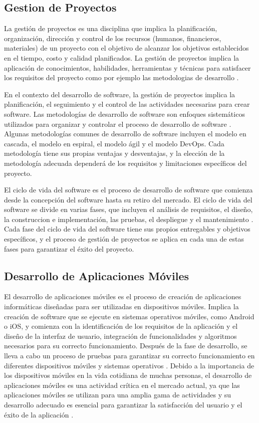 \documentclass[runningheads]{llncs}
\begin{document}
        \subsection{Gestion de Proyectos}
            La gestión de proyectos es una disciplina que implica la planificación, organización, dirección y control de los recursos (humanos, financieros, materiales) de un proyecto con el objetivo de alcanzar los objetivos establecidos en el tiempo, costo y calidad planificados. La gestión de proyectos implica la aplicación de conocimientos, habilidades, herramientas y técnicas para satisfacer los requisitos del proyecto como por ejemplo las metodologias de desarrollo \cite{Cita1}.

            En el contexto del desarrollo de software, la gestión de proyectos implica la planificación, el seguimiento y el control de las actividades necesarias para crear software. Las metodologías de desarrollo de software son enfoques sistemáticos utilizados para organizar y controlar el proceso de desarrollo de software \cite{Cita2}. Algunas metodologías comunes de desarrollo de software incluyen el modelo en cascada, el modelo en espiral, el modelo ágil y el modelo DevOps. Cada metodología tiene sus propias ventajas y desventajas, y la elección de la metodología adecuada dependerá de los requisitos y limitaciones específicos del proyecto.

            El ciclo de vida del software es el proceso de desarrollo de software que comienza desde la concepción del software hasta su retiro del mercado. El ciclo de vida del software se divide en varias fases, que incluyen el análisis de requisitos, el diseño, la construccion e implementación, las pruebas, el despliegue y el mantenimiento \cite{Cita3}. Cada fase del ciclo de vida del software tiene sus propios entregables y objetivos específicos, y el proceso de gestión de proyectos se aplica en cada una de estas fases para garantizar el éxito del proyecto.

        \subsection{Desarrollo de Aplicaciones Móviles}
            El desarrollo de aplicaciones móviles es el proceso de creación de aplicaciones informáticas diseñadas para ser utilizadas en dispositivos móviles. Implica la creación de software que se ejecute en sistemas operativos móviles, como Android o iOS, y comienza con la identificación de los requisitos de la aplicación y el diseño de la interfaz de usuario, integración de funcionalidades y algoritmos necesarios para su correcto funcionamiento. Después de la fase de desarrollo, se lleva a cabo un proceso de pruebas para garantizar su correcto funcionamiento en diferentes dispositivos móviles y sistemas operativos \cite{Cita4}.
            Debido a la importancia de los dispositivos móviles en la vida cotidiana de muchas personas, el desarrollo de aplicaciones móviles es una actividad crítica en el mercado actual, ya que las aplicaciones móviles se utilizan para una amplia gama de actividades y su desarrollo adecuado es esencial para garantizar la satisfacción del usuario y el éxito de la aplicación \cite{Cita5}.
\end{document}
